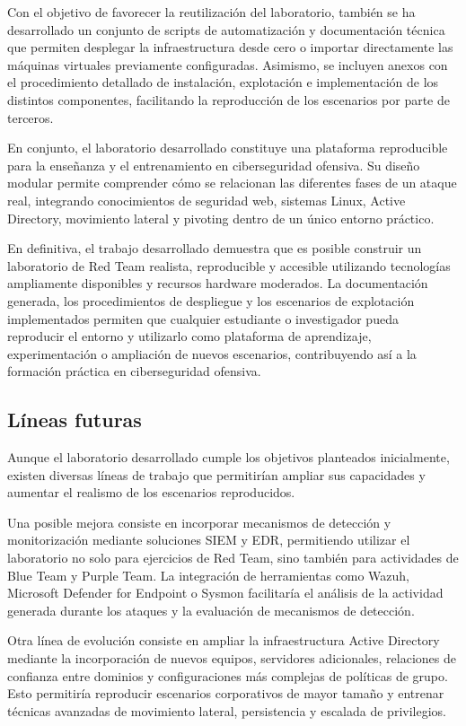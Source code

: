 Con el objetivo de favorecer la reutilización del laboratorio, también se ha desarrollado un conjunto de scripts de automatización y documentación técnica que permiten desplegar la infraestructura desde cero o importar directamente las máquinas virtuales previamente configuradas. Asimismo, se incluyen anexos con el procedimiento detallado de instalación, explotación e implementación de los distintos componentes, facilitando la reproducción de los escenarios por parte de terceros.

En conjunto, el laboratorio desarrollado constituye una plataforma reproducible para la enseñanza y el entrenamiento en ciberseguridad ofensiva. Su diseño modular permite comprender cómo se relacionan las diferentes fases de un ataque real, integrando conocimientos de seguridad web, sistemas Linux, Active Directory, movimiento lateral y pivoting dentro de un único entorno práctico.

En definitiva, el trabajo desarrollado demuestra que es posible construir un laboratorio de Red Team realista, reproducible y accesible utilizando tecnologías ampliamente disponibles y recursos hardware moderados. La documentación generada, los procedimientos de despliegue y los escenarios de explotación implementados permiten que cualquier estudiante o investigador pueda reproducir el entorno y utilizarlo como plataforma de aprendizaje, experimentación o ampliación de nuevos escenarios, contribuyendo así a la formación práctica en ciberseguridad ofensiva.

\subsection{Líneas futuras}

Aunque el laboratorio desarrollado cumple los objetivos planteados inicialmente, existen diversas líneas de trabajo que permitirían ampliar sus capacidades y aumentar el realismo de los escenarios reproducidos.

Una posible mejora consiste en incorporar mecanismos de detección y monitorización mediante soluciones SIEM y EDR, permitiendo utilizar el laboratorio no solo para ejercicios de Red Team, sino también para actividades de Blue Team y Purple Team. La integración de herramientas como Wazuh, Microsoft Defender for Endpoint o Sysmon facilitaría el análisis de la actividad generada durante los ataques y la evaluación de mecanismos de detección.

Otra línea de evolución consiste en ampliar la infraestructura Active Directory mediante la incorporación de nuevos equipos, servidores adicionales, relaciones de confianza entre dominios y configuraciones más complejas de políticas de grupo. Esto permitiría reproducir escenarios corporativos de mayor tamaño y entrenar técnicas avanzadas de movimiento lateral, persistencia y escalada de privilegios.


